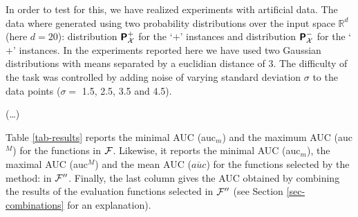 \documentclass[twocolumn,english]{article}
\newcommand{\Prob}{\textbf{\textsf{\textup{P}}}}  %
\newcommand{\Reel}{\mathbb{R}}                           %
\begin{document}
In order to test for this, we have realized experiments with artificial data. The data where generated using two probability distributions over the input space $\Reel^d$ (here $d = 20$): distribution $\Prob_{\cal X}^+$ for the `$+$' instances and distribution $\Prob_{\cal X}^-$ for the `$+$' instances. In the experiments reported here we have used two Gaussian distributions with means separated by a euclidian distance of 3. The difficulty of the task was controlled by adding noise of varying standard deviation $\sigma$ to the data points ($\sigma =$ 1.5, 2.5, 3.5 and 4.5).

(\ldots)

Table \ref{tab-results} reports the minimal AUC (auc$_m$) and the maximum AUC (auc$^M$) for the functions in $\cal F$. Likewise, it reports the minimal AUC (auc$_m$), the maximal AUC (auc$^M$) and the mean AUC ($\overline{auc}$) for the functions selected by the method: in ${\cal F}''$. Finally, the last column gives the AUC obtained by combining the results of the evaluation functions selected in ${\cal F}''$ (see Section \ref{sec-combinations} for an explanation). 
\end{document}
